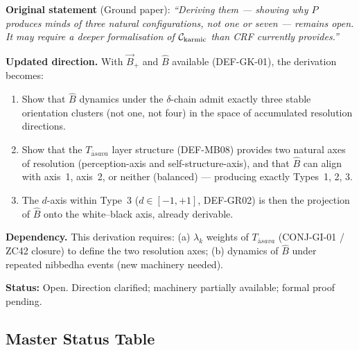 \documentclass[12pt, a4paper]{article}
\providecommand{\Bvec}{\vec{B}_{+}}
\providecommand{\Tasava}{T_{\bar{\mathrm{a}}sava}}
\providecommand{\Tasava}{\mathcal{T}_{\!\mathrm{\bar{a}sava}}}
\begin{document}

\begin{openqbox}[title={GAP-GK-01: Derive Type from
  $\hat{B}$ Dynamics (Updated Direction of GAP-GR-TYPE-01)}]
\textbf{Original statement} (Ground paper):
\textit{``Deriving them --- showing why $P$ produces minds
of three natural configurations, not one or seven ---
remains open. It may require a deeper formalisation of
$\mathcal{C}_{\rm karmic}$ than CRF currently provides.''}

\textbf{Updated direction.}
With $\Bvec$ and $\hat{B}$ available (DEF-GK-01), the
derivation becomes:

\begin{enumerate}[leftmargin=*, noitemsep]
\item Show that $\hat{B}$ dynamics under the $\delta$-chain
  admit exactly three stable orientation clusters
  (not one, not four) in the space of accumulated
  resolution directions.

\item Show that the $\Tasava$ layer structure
  (DEF-MB08) provides two natural axes of resolution
  (perception-axis and self-structure-axis), and that
  $\hat{B}$ can align with axis~1, axis~2, or neither
  (balanced) --- producing exactly Types~1, 2, 3.

\item The $d$-axis within Type~3 ($d \in [-1,+1]$,
  DEF-GR02) is then the projection of $\hat{B}$ onto
  the white--black axis, already derivable.
\end{enumerate}

\textbf{Dependency.}
This derivation requires: (a) $\lambda_k$ weights
of $\Tasava$ (CONJ-GI-01 / ZC42 closure) to define
the two resolution axes; (b) dynamics of $\hat{B}$
under repeated nibbedha events (new machinery needed).

\textbf{Status:} Open. Direction clarified;
machinery partially available; formal proof pending.
\end{openqbox}

\subsection{Master Status Table}

\end{document}
